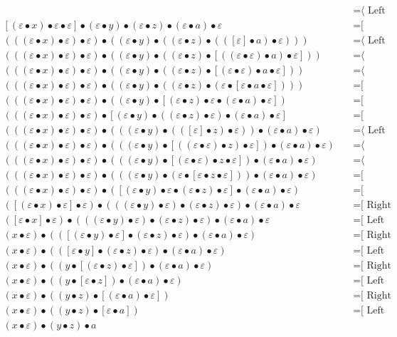 \documentclass{article}
\begin{document}
\begin{align*}
  & \quad \text{=⟨ Left neutrality ]}\\
[(ε • x) • ε • ε] • (ε • y) • (ε • z) • (ε • a) • ε
  & \quad \text{=[ Associativity ⟩}\\
(((ε • x) • ε) • ε) • ((ε • y) • ((ε • z) • (([ε] • a) • ε)))
  & \quad \text{=⟨ Left neutrality ]}\\
(((ε • x) • ε) • ε) • ((ε • y) • ((ε • z) • [((ε • ε) • a) • ε]))
  & \quad \text{=⟨ Associativity ]}\\
(((ε • x) • ε) • ε) • ((ε • y) • ((ε • z) • [(ε • ε) • a • ε]))
  & \quad \text{=⟨ Associativity ]}\\
(((ε • x) • ε) • ε) • ((ε • y) • ((ε • z) • (ε • [ε • a • ε])))
  & \quad \text{=[ Associativity ⟩}\\
(((ε • x) • ε) • ε) • ((ε • y) • [(ε • z) • ε • (ε • a) • ε])
  & \quad \text{=[ Associativity ⟩}\\
(((ε • x) • ε) • ε) • [(ε • y) • ((ε • z) • ε) • (ε • a) • ε]
  & \quad \text{=[ Associativity ⟩}\\
(((ε • x) • ε) • ε) • (((ε • y) • (([ε] • z) • ε)) • (ε • a) • ε)
  & \quad \text{=⟨ Left neutrality ]}\\
(((ε • x) • ε) • ε) • (((ε • y) • [((ε • ε) • z) • ε]) • (ε • a) • ε)
  & \quad \text{=⟨ Associativity ]}\\
(((ε • x) • ε) • ε) • (((ε • y) • [(ε • ε) • z • ε]) • (ε • a) • ε)
  & \quad \text{=⟨ Associativity ]}\\
(((ε • x) • ε) • ε) • (((ε • y) • (ε • [ε • z • ε])) • (ε • a) • ε)
  & \quad \text{=[ Associativity ⟩}\\
(((ε • x) • ε) • ε) • ([(ε • y) • ε • (ε • z) • ε] • (ε • a) • ε)
  & \quad \text{=[ Associativity ⟩}\\
([(ε • x) • ε] • ε) • (((ε • y) • ε) • (ε • z) • ε) • (ε • a) • ε
  & \quad \text{=[ Right neutrality ⟩}\\
([ε • x] • ε) • (((ε • y) • ε) • (ε • z) • ε) • (ε • a) • ε
  & \quad \text{=[ Left neutrality ⟩}\\
(x • ε) • (([(ε • y) • ε] • (ε • z) • ε) • (ε • a) • ε)
  & \quad \text{=[ Right neutrality ⟩}\\
(x • ε) • (([ε • y] • (ε • z) • ε) • (ε • a) • ε)
  & \quad \text{=[ Left neutrality ⟩}\\
(x • ε) • ((y • [(ε • z) • ε]) • (ε • a) • ε)
  & \quad \text{=[ Right neutrality ⟩}\\
(x • ε) • ((y • [ε • z]) • (ε • a) • ε)
  & \quad \text{=[ Left neutrality ⟩}\\
(x • ε) • ((y • z) • [(ε • a) • ε])
  & \quad \text{=[ Right neutrality ⟩}\\
(x • ε) • ((y • z) • [ε • a])
  & \quad \text{=[ Left neutrality ⟩}\\
(x • ε) • (y • z) • a
\end{align*}
\end{document}
